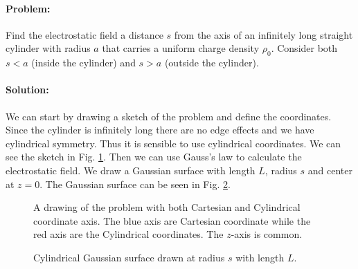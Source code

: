 \paragraph{Problem:} Find the electrostatic field a distance $s$ from the axis of an infinitely long straight cylinder with radius $a$ that carries a uniform charge density $\rho_0$. Consider both $s < a$ (inside the cylinder) and $s > a$ (outside the cylinder).

\paragraph{Solution:} We can start by drawing a sketch of the problem and define the coordinates. Since the cylinder is infinitely long there are no edge effects and we have cylindrical symmetry. Thus it is sensible to use cylindrical coordinates. We can see the sketch in Fig. \ref{fig:sketch}. Then we can use Gauss's law to calculate the electrostatic field. We draw a Gaussian surface with length $L$, radius $s$ and center at $z=0$. The Gaussian surface can be seen in Fig. \ref{fig:gauss}.

\begin{figure}[H]
    \centering
    
    \caption{A drawing of the problem with both Cartesian and Cylindrical coordinate axis. The blue axis are Cartesian coordinate while the red axis are the Cylindrical coordinates. The $z$-axis is common.}\label{fig:sketch}
\end{figure}

\begin{figure}[H]
    \centering
    
    \caption{Cylindrical Gaussian surface drawn at radius $s$ with length $L$.}\label{fig:gauss}
\end{figure}

